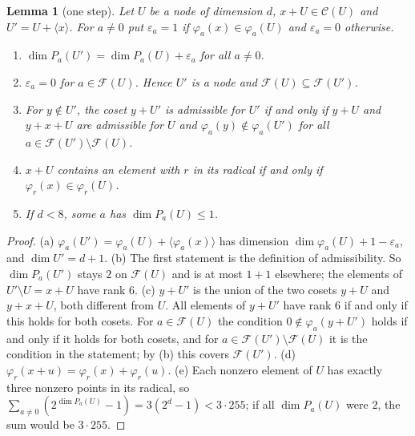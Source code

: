 \documentclass[11pt]{article}
\newtheorem{lemma}[theorem]{Lemma}
\theoremstyle{definition}
\begin{document}
\begin{lemma}[one step]\label{lem:B-step}
Let $U$ be a node of dimension $d$, $x+U\in\mathcal C(U)$ and $U'=U+\langle x\rangle$. For
$a\neq0$ put $\varepsilon_a=1$ if $\varphi_a(x)\in\varphi_a(U)$ and $\varepsilon_a=0$ otherwise.
\begin{enumerate}
\item[(a)] $\dim P_a(U')=\dim P_a(U)+\varepsilon_a$ for all $a\neq0$.
\item[(b)] $\varepsilon_a=0$ for $a\in\mathcal F(U)$. Hence $U'$ is a node and
$\mathcal F(U)\subseteq\mathcal F(U')$.
\item[(c)] For $y\notin U'$, the coset $y+U'$ is admissible for $U'$ if and only if $y+U$ and
$y+x+U$ are admissible for $U$ and $\varphi_a(y)\notin\varphi_a(U')$ for all
$a\in\mathcal F(U')\setminus\mathcal F(U)$.
\item[(d)] $x+U$ contains an element with $r$ in its radical if and only if
$\varphi_r(x)\in\varphi_r(U)$.
\item[(e)] If $d<8$, some $a$ has $\dim P_a(U)\le1$.
\end{enumerate}
\end{lemma}
\begin{proof}
(a) $\varphi_a(U')=\varphi_a(U)+\langle\varphi_a(x)\rangle$ has dimension
$\dim\varphi_a(U)+1-\varepsilon_a$, and $\dim U'=d+1$. (b) The first statement is the
definition of admissibility. So $\dim P_a(U')$ stays $2$ on $\mathcal F(U)$ and is at most
$1+1$ elsewhere; the elements of $U'\setminus U=x+U$ have rank $6$. (c) $y+U'$ is the union of
the two cosets $y+U$ and $y+x+U$, both different from $U$. All elements of $y+U'$ have rank $6$
if and only if this holds for both cosets. For $a\in\mathcal F(U)$ the condition
$0\notin\varphi_a(y+U')$ holds if and only if it holds for both cosets, and for
$a\in\mathcal F(U')\setminus\mathcal F(U)$ it is the condition in the statement; by (b) this
covers $\mathcal F(U')$. (d) $\varphi_r(x+u)=\varphi_r(x)+\varphi_r(u)$. (e) Each nonzero
element of $U$ has exactly three nonzero points in its radical, so
$\sum_{a\neq0}(2^{\dim P_a(U)}-1)=3(2^d-1)<3\cdot255$; if all $\dim P_a(U)$ were $2$, the sum
would be $3\cdot255$.
\end{proof}
\end{document}
